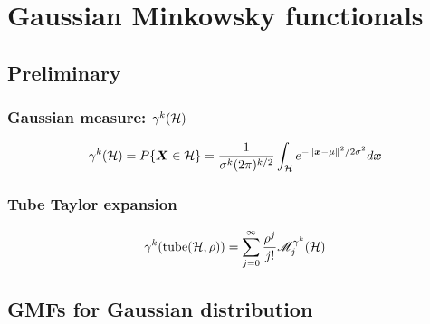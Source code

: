 \documentclass[12pt]{article}
\begin{document}
\section{Gaussian Minkowsky functionals}
\subsection{Preliminary}
\subsubsection{Gaussian measure: $\gamma^k(\mathcal{H})$}
\begin{equation}
  \gamma^k(\mathcal{H}) = P\{\boldsymbol{X}\in\mathcal{H}\}=\frac{1}{\sigma^k(2\pi)^{k/2}} \int_{\mathcal{H}} e^{-\|\boldsymbol{x}-\mu\|^2/2\sigma^2} d\boldsymbol{x}
\end{equation}
\subsubsection{Tube Taylor expansion}
\begin{equation}
  \gamma^k(\text{tube}(\mathcal{H},\rho))=\sum_{j=0}^{\infty} \frac{\rho^j}{j!}\mathscr{M}^{\gamma^k}_j(\mathcal{H})
\end{equation}

\subsection{GMFs for Gaussian distribution}
\end{document}
